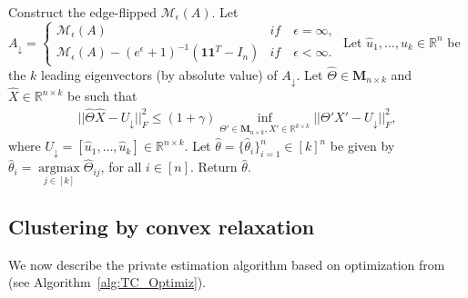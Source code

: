 \documentclass{article}
\begin{document}
\begin{algorithm}
\caption{EF Spectral Clustering (k-means) from \cite{HehEtal22}}
\label{alg:EF_Spec_Clus}
\begin{algorithmic}[1]
    \State Construct the edge-flipped $\mathcal{M}_\epsilon(A)$.
    \State Let $A_{\downarrow} = \begin{cases}
 \mathcal{M}_\epsilon(A) & if \quad \epsilon = \infty,\\    
  \mathcal{M}_\epsilon(A) - (e^\epsilon + 1)^{-1}(\textbf{1}\textbf{1}^T- I_n) & if \quad  \epsilon < \infty.
\end{cases}$
    \State Let $\hat{u}_1, \dots, \hat{u}_k \in \mathbb{R}^n$ be the $k$ leading eigenvectors (by absolute value) of $A_{\downarrow}$.
    \State Let $\hat{\Theta} \in \mathbf{M}_{n\times k}$ and $\hat{X} \in \mathbb{R}^{n \times k}$ be such that 
    \begin{align*}
        ||\hat{\Theta}\hat{X} - U_{\downarrow}||_F^2 \leq (1 + \gamma)\mathop{\inf}\limits_{\Theta' \in \mathbf{M}_{n\times k}, X' \in \mathbb{R}^{k \times k}}||\Theta'X' - U_{\downarrow}||_F^2,
    \end{align*}
    where $U_{\downarrow} = [\hat{u}_1, \dots, \hat{u}_k] \in \mathbb{R}^{n \times k}$.
    \State Let $\hat{\theta} = \{\hat{\theta}_i\}_{i = 1}^n \in [k]^n$ be given by $\hat{\theta}_i = \mathop{\arg\max}\limits_{j \in [k]}\hat{\Theta}_{ij}$, for all $i \in [n]$.
    \State Return $\hat{\theta}$.
\EndFunction
\end{algorithmic}
\end{algorithm}


\subsection{Clustering by convex relaxation}
\label{AppSCOpt}

We now describe the private estimation algorithm based on optimization from \cite{CheEtal23} (see Algorithm~\ref{alg:TC_Optimiz}).
\end{document}

